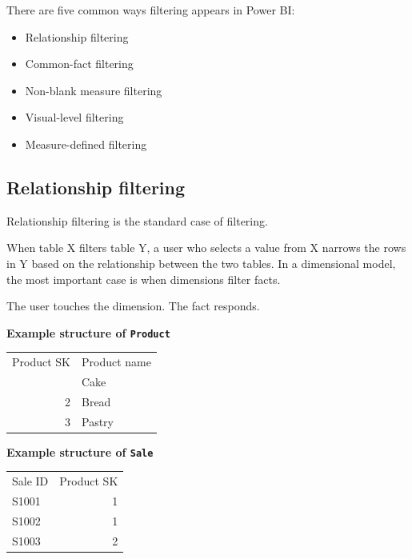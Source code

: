 \documentclass[10pt,openany,10pt]{book}
\providecommand{\tightlist}{%
  \setlength{\itemsep}{0pt}\setlength{\parskip}{0pt}}
\newcounter{none}
\let\podeToprule\toprule
\let\podeMidrule\midrule
\let\podeBottomrule\bottomrule
\renewcommand{\toprule}{\arrayrulecolor{pbiGrid}\podeToprule}
\renewcommand{\midrule}{\arrayrulecolor{pbiGrid}\podeMidrule}
\renewcommand{\bottomrule}{\arrayrulecolor{pbiGrid}\podeBottomrule}
\begin{document}
There are five common ways filtering appears in Power BI:

\begin{itemize}
\tightlist
\item
  Relationship filtering
\item
  Common-fact filtering
\item
  Non-blank measure filtering
\item
  Visual-level filtering
\item
  Measure-defined filtering
\end{itemize}

\subsection{Relationship filtering}\label{relationship-filtering}

Relationship filtering is the standard case of filtering.

When table X filters table Y, a user who selects a value from X narrows
the rows in Y based on the relationship between the two tables. In a
dimensional model, the most important case is when dimensions filter
facts.

The user touches the dimension. The fact responds.

\textbf{Example structure of
\texttt{\textquotesingle{}Product\textquotesingle{}}}

{\def\LTcaptype{none} %
\begin{longtable}[]{@{}rl@{}}
\toprule\noalign{}
Product SK & Product name \\
\midrule\noalign{}
\endhead
\bottomrule\noalign{}
\endlastfoot
1 & Cake \\
2 & Bread \\
3 & Pastry \\
\end{longtable}
}

\textbf{Example structure of
\texttt{\textquotesingle{}Sale\textquotesingle{}}}

{\def\LTcaptype{none} %
\begin{longtable}[]{@{}lr@{}}
\toprule\noalign{}
Sale ID & Product SK \\
\midrule\noalign{}
\endhead
\bottomrule\noalign{}
\endlastfoot
S1001 & 1 \\
S1002 & 1 \\
S1003 & 2 \\
\end{longtable}
}
\end{document}
